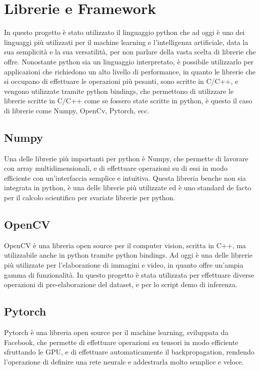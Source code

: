 \section{Librerie e Framework\ok}

In questo progetto è stato utilizzato il linguaggio python che ad oggi è uno dei linguaggi più utilizzati per il machine learning e l'intelligenza artificiale,
data la sua semplicità e la sua versatilità, per non parlare della vasta scelta di librerie che offre.
Nonostante python sia un linguaggio interpretato, è possibile utilizzarlo per applicazioni che richiedono un alto livello di performance,
in quanto le librerie che si occupano di effettuare le operazioni più pesanti, sono scritte in C/C++, e vengono 
utilizzate tramite python bindings, che permettono di utilizzare le librerie scritte in C/C++ come se fossero state scritte in python,
è questo il caso di librerie come Numpy, OpenCv, Pytorch, ecc.

\subsection{Numpy\ok}
Una delle librerie più importanti per python è Numpy, che permette di lavorare con array multidimensionali, e di effettuare operazioni su di essi 
in modo efficiente con un'interfaccia semplice e intuitiva. Questa libreria benche non sia integrata in python, è una delle librerie più utilizzate
ed è uno standard de facto per il calcolo scientifico per svariate librerie per python.

\subsection{OpenCV\ok}
OpenCV è una libreria open source per il computer vision, scritta in C++, ma utilizzabile anche in python tramite python bindings.
Ad oggi è una delle librerie più utilizzate per l'elaborazione di immagini e video, in quanto offre un'ampia gamma di funzionalità.
In questo progetto è stata utilizzata per effettuare diverse operazioni di pre-elaborazione del dataset, e per lo script demo di inferenza.

\subsection{Pytorch\ok}
Pytorch è una libreria open source per il machine learning, sviluppata da Facebook, che permette di effettuare operazioni su tensori in modo efficiente
sfruttando le GPU, e di effettuare automaticamente il backpropagation, rendendo l'operazione di definire una rete neurale e addestrarla
molto semplice e veloce.

